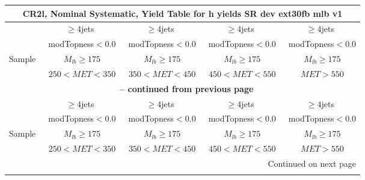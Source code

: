 \documentclass{article}
\begin{document}
\begin{longtable}{|l|c|c|c|c|} 
 
\multicolumn{5}{c}{ CR2l, Nominal Systematic, Yield Table for h yields SR dev ext30fb mlb v1 }\\* \hline 
  & $\ge4$jets  & $\ge4$jets  & $\ge4$jets  & $\ge4$jets \\* 
  & ~modTopness$<0.0$  & ~modTopness$<0.0$  & ~modTopness$<0.0$  & ~modTopness$<0.0$ \\* 
Sample  & ~$M_{lb}\ge175$  & ~$M_{lb}\ge175$  & ~$M_{lb}\ge175$  & ~$M_{lb}\ge175$ \\* 
  & ~$250<MET<350$  & ~$350<MET<450$  & ~$450<MET<550$  & ~$MET>550$ \\* 
\hline \hline 
\endfirsthead 
 
\multicolumn{5}{c}{{\bfseries \tablename\ \thetable{} -- continued from previous page}}\\* \hline 
  & $\ge4$jets  & $\ge4$jets  & $\ge4$jets  & $\ge4$jets \\* 
  & ~modTopness$<0.0$  & ~modTopness$<0.0$  & ~modTopness$<0.0$  & ~modTopness$<0.0$ \\* 
Sample  & ~$M_{lb}\ge175$  & ~$M_{lb}\ge175$  & ~$M_{lb}\ge175$  & ~$M_{lb}\ge175$ \\* 
  & ~$250<MET<350$  & ~$350<MET<450$  & ~$450<MET<550$  & ~$MET>550$ \\* 
\hline \hline 
\endhead 
 
\multicolumn{5}{|r|}{{Continued on next page}}\\* \hline 
\endfoot 
 
 
\endlastfoot 
 

\end{longtable}
\end{document}
